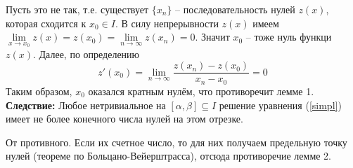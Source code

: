 \Proof Пусть это не так, т.е. существует $\{x_n\}$ -- последовательность нулей $z(x)$, которая сходится к $x_0 \in I$. В силу непрерывности $z(x)$ имеем $\lim\limits_{x\to x_0}z(x) = z(x_0)= \lim\limits_{n\to\infty}z(x_n) = 0$. \newline Значит $x_0$ -- тоже нуль функци $z(x)$. Далее, по определению
\begin{equation*}
    z'(x_0)=\lim\limits_{n\to\infty}\frac{z(x_n)-z(x_0)}{x_n-x_0}=0
\end{equation*}
Таким образом, $x_0$ оказался кратным нулём, что противоречит лемме 1. \;\EndProof
\bigbreak
\textbf{Следствие:} Любое нетривиальное на $[\alpha, \beta] \subseteq I$ решение уравнения (\ref{simpl}) имеет не более конечного числа нулей на этом отрезке.

\Proof От противного. Если их счетное число, то для них получаем предельную точку нулей (теореме по Больцано-Вейерштрасса), отсюда противоречие лемме 2. \;\EndProof
\newpage

